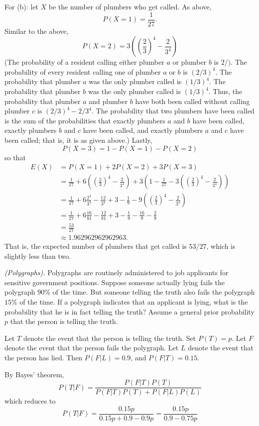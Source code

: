\begin{solution}
  For (b): let $X$ be the number of plumbers who get called.  As above,
  \[
    P(X = 1)=\frac{1}{27}.
  \]
  Similar to the above,
  \[
    P(X = 2) = 3\left(\left(\frac{2}{3}\right)^4 - \frac{2}{3^4}
    \right)
  \]
  (The probability of a resident calling either plumber $a$ or plumber $b$
  is $2/)$. The probability of every resident calling one of plumber $a$ or
  $b$ is $(2/3)^4$. The probability that plumber $a$ was the only plumber
  called is $(1/3)^4$. The probability that plumber $b$ was the only
  plumber called is $(1/3)^4$. Thus, the probability that plumber $a$ and
  plumber $b$ have both been called without calling plumber $c$ is
  $(2/3)^4-2/3^4$. The probability that two plumbers have been called is
  the sum of the probabilities that exactly plumbers $a$ and $b$ have been
  called, exactly plumbers $b$ and $c$ have been called, and exactly
  plumbers $a$ and $c$ have been called; that is, it is as given above.)
  Lastly,
  \[
    P(X = 3) = 1-P(X = 1)-P(X = 2)
  \]
  so that
  \begin{align*}
    E(X) &= P(X=1) + 2P(X=2) + 3P(X = 3) \\
             &= \frac{1}{27} + 6\left(\left(\frac{2}{3}\right)^4 - \frac{2}{3^4} \right) + 3\left(1-\frac{1}{27} -  3\left(\left(\frac{2}{3}\right)^4 - \frac{2}{3^4} \right)\right) \\
             &= \frac{1}{27} + 6\frac{2^4}{3^4} - \frac{12}{3^4} + 3-\frac{1}{9} -  9\left(\left(\frac{2}{3}\right)^4 - \frac{2}{3^4} \right)\\
             &= \frac{1}{27} + 6\frac{16}{81} - \frac{12}{81} + 3-\frac{1}{9} -  \frac{16}{9} - \frac{2}{9}\\
             &= \frac{53}{27}\\
             &\approx\num{1.962962962962963}.
  \end{align*}
  That is, the expected number of plumbers that get called is $53/27$,
  which is slightly less than two.
\end{solution}
\newpage

\begin{problem}[Handout 4, \# 7]
  \emph{(Polygraphs).} Polygraphs are routinely administered to job
  applicants for sensitive government positions. Suppose someone actually
  lying fails the polygraph \(90\%\) of the time. But someone telling the
  truth also fails the polygraph \(15\%\) of the time. If a polygraph
  indicates that an applicant is lying, what is the probability that he is
  in fact telling the truth? Assume a general prior probability \(p\) that
  the person is telling the truth.
\end{problem}
\begin{solution}
  Let $T$ denote the event that the person is telling the truth. Set
  $P(T) = p$. Let $F$ denote the event that the person fails the
  polygraph. Let $L$ denote the event that the person has lied. Then
  $P(F|L) = 0.9$, and $P(F|T) = 0.15$.

  By Bayes' theorem,
  \[
    P(T|F) = \frac{P(F|T)P(T)}{P(F|T)P(T) + P(F|L)P(L)}
  \]
  which reduces to
  \[
    P(T|F) = \frac{0.15p}{0.15p + 0.9 - 0.9p} = \frac{0.15p}{0.9 -
      0.75p}
  \]
\end{solution}
\newpage


